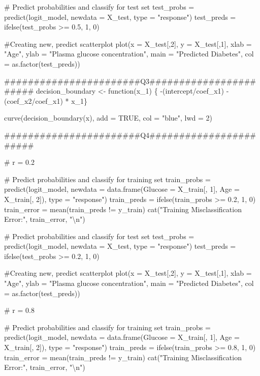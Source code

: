 \documentclass[
]{article}
\newenvironment{Shaded}{\begin{snugshade}}{\end{snugshade}}
\newcommand{\NormalTok}[1]{#1}
\begin{document}
\begin{Shaded}
\begin{Highlighting}[]
\NormalTok{\# Predict probabilities and classify for test set}
\NormalTok{test\_probs = predict(logit\_model, newdata = X\_test, type = "response")}
\NormalTok{test\_preds = ifelse(test\_probs \textgreater{}= 0.5, 1, 0)}

\NormalTok{\#Creating new, predict scatterplot}
\NormalTok{plot(x = X\_test[,2], }
\NormalTok{     y = X\_test[,1],}
\NormalTok{     xlab = "Age",}
\NormalTok{     ylab = "Plasma glucose concentration",}
\NormalTok{     main = "Predicted Diabetes",}
\NormalTok{     col = as.factor(test\_preds))}

\NormalTok{\#\#\#\#\#\#\#\#\#\#\#\#\#\#\#\#\#\#\#\#\#\#\#Q3\#\#\#\#\#\#\#\#\#\#\#\#\#\#\#\#\#\#\#\#\#\#\#}
\NormalTok{decision\_boundary \textless{}{-} function(x\_1) \{}
\NormalTok{  {-}(intercept/coef\_x1) {-} (coef\_x2/coef\_x1) * x\_1\}}

\NormalTok{curve(decision\_boundary(x), add = TRUE, col = "blue", lwd = 2)}

\NormalTok{\#\#\#\#\#\#\#\#\#\#\#\#\#\#\#\#\#\#\#\#\#\#\#Q4\#\#\#\#\#\#\#\#\#\#\#\#\#\#\#\#\#\#\#\#\#\#\#}

\NormalTok{\#  r = 0.2}

\NormalTok{\# Predict probabilities and classify for training set}
\NormalTok{train\_probs = predict(logit\_model, newdata = data.frame(Glucose = X\_train[, 1], Age = X\_train[, 2]), type = "response")}
\NormalTok{train\_preds = ifelse(train\_probs \textgreater{}= 0.2, 1, 0)}
\NormalTok{train\_error = mean(train\_preds != y\_train)}
\NormalTok{cat("Training Misclassification Error:", train\_error, "\textbackslash{}n")}


\NormalTok{\# Predict probabilities and classify for test set}
\NormalTok{test\_probs = predict(logit\_model, newdata = X\_test, type = "response")}
\NormalTok{test\_preds = ifelse(test\_probs \textgreater{}= 0.2, 1, 0)}

\NormalTok{\#Creating new, predict scatterplot}
\NormalTok{plot(x = X\_test[,2], }
\NormalTok{     y = X\_test[,1],}
\NormalTok{     xlab = "Age",}
\NormalTok{     ylab = "Plasma glucose concentration",}
\NormalTok{     main = "Predicted Diabetes",}
\NormalTok{     col = as.factor(test\_preds))}



\NormalTok{\#  r = 0.8}

\NormalTok{\# Predict probabilities and classify for training set}
\NormalTok{train\_probs = predict(logit\_model, newdata = data.frame(Glucose = X\_train[, 1], Age = X\_train[, 2]), type = "response")}
\NormalTok{train\_preds = ifelse(train\_probs \textgreater{}= 0.8, 1, 0)}
\NormalTok{train\_error = mean(train\_preds != y\_train)}
\NormalTok{cat("Training Misclassification Error:", train\_error, "\textbackslash{}n")}



\end{Highlighting}
\end{Shaded}
\end{document}
